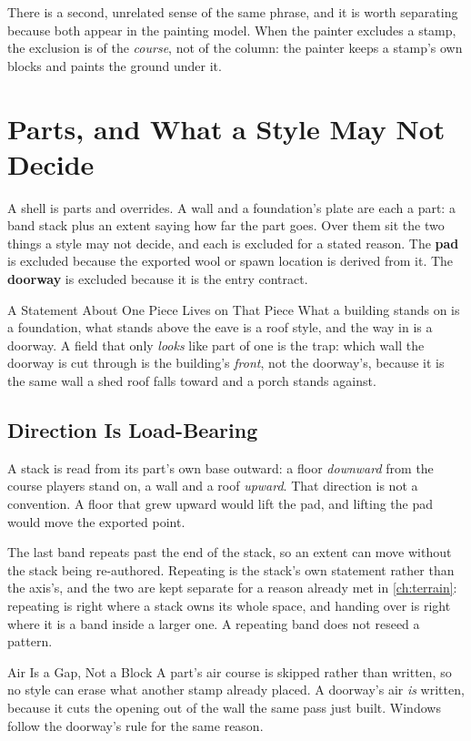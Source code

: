 There is a second, unrelated sense of the same phrase, and it is worth separating
because both appear in the painting model. When the painter excludes a stamp, the
exclusion is of the \emph{course}, not of the column: the painter keeps a stamp's
own blocks and paints the ground under it.

\section{Parts, and What a Style May Not Decide}

A shell is parts and overrides. A wall and a foundation's plate are each a part: a
band stack plus an extent saying how far the part goes. Over them sit the two
things a style may not decide, and each is excluded for a stated reason. The
\textbf{pad} is excluded because the exported wool or spawn location is derived
from it. The \textbf{doorway} is excluded because it is the entry contract.

\begin{ruling}{A Statement About One Piece Lives on That Piece}
What a building stands on is a foundation, what stands above the eave is a roof
style, and the way in is a doorway. A field that only \emph{looks} like part of one
is the trap: which wall the doorway is cut through is the building's \emph{front},
not the doorway's, because it is the same wall a shed roof falls toward and a porch
stands against.
\end{ruling}

\subsection{Direction Is Load-Bearing}

A stack is read from its part's own base outward: a floor \emph{downward} from the
course players stand on, a wall and a roof \emph{upward}. That direction is not a
convention. A floor that grew upward would lift the pad, and lifting the pad would
move the exported point.

The last band repeats past the end of the stack, so an extent can move without the
stack being re-authored. Repeating is the stack's own statement rather than the
axis's, and the two are kept separate for a reason already met in
\cref{ch:terrain}: repeating is right where a stack owns its whole space, and
handing over is right where it is a band inside a larger one. A repeating band does
not reseed a pattern.

\begin{ruling}{Air Is a Gap, Not a Block}
A part's air course is skipped rather than written, so no style can erase what
another stamp already placed. A doorway's air \emph{is} written, because it cuts
the opening out of the wall the same pass just built. Windows follow the doorway's
rule for the same reason.
\end{ruling}

